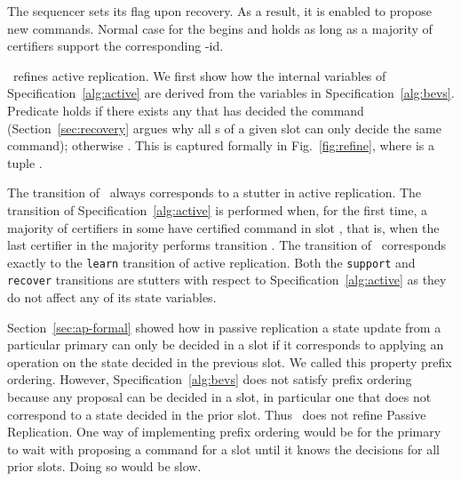 \noindent
The sequencer sets its  flag upon recovery.  As a result, it
is enabled to propose new commands. Normal case for the {\round} begins
and holds as long as a majority of certifiers support the corresponding
{\round}-id.



\multiconsensus\ refines active replication.
We first show how the internal variables of Specification~\ref{alg:active} are
derived from the variables in Specification~\ref{alg:bevs}.
Predicate  holds if there exists any {\round} that has decided
the command (Section~\ref{sec:recovery} argues why all {\round}s of a given slot can only decide the same command); otherwise .
This is captured formally in
Fig.~\ref{fig:refine}, where  is a tuple .

The transition 
 of \multiconsensus\ always corresponds to a stutter in active replication.
The  transition
of Specification~\ref{alg:active} is performed
when, for the first time, a majority of certifiers in some
{\round}  have certified command 
in slot , that is, when
the last certifier  in the majority performs transition
.
The \texttt{\observedecision} transition of \multiconsensus\ corresponds exactly
to the \texttt{learn} transition of active replication.  Both the \texttt{support{\Round}} and \texttt{recover} transitions are
stutters with respect to Specification~\ref{alg:active} as they
do not affect any of its state variables.


\label{sec:bev-prefix}

Section~\ref{sec:ap-formal} showed how in passive replication a state
update from a particular primary can only be decided in a slot if it corresponds to applying an operation
on the state decided in the previous slot.
We called this property prefix ordering.
However, Specification~\ref{alg:bevs} does not satisfy prefix ordering
because any proposal can be decided in a slot, in particular one that
does not correspond to a state decided in the prior slot.
Thus \multiconsensus\ does not refine Passive Replication.
One way of implementing prefix ordering would be for the primary to
wait with proposing a command for a slot until it knows the decisions
for all prior slots.
Doing so would be slow.

